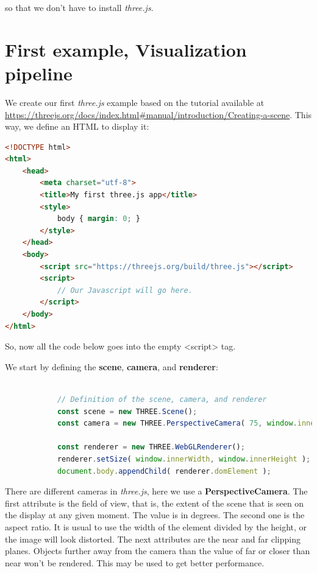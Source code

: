 \documentclass{article}
\begin{document}
so that we don't have to install \textit{three.js}.

\section{First example, Visualization pipeline}
We create our first \textit{three.js} example based on the tutorial available at \url{https://threejs.org/docs/index.html#manual/introduction/Creating-a-scene}. This way, we define an HTML to display it: 

\begin{lstlisting}[language=html, caption=Creating an HTML for display.]
<!DOCTYPE html>
<html>
	<head>
		<meta charset="utf-8">
		<title>My first three.js app</title>
		<style>
			body { margin: 0; }
		</style>
	</head>
	<body>
		<script src="https://threejs.org/build/three.js"></script>
		<script>
			// Our Javascript will go here.
		</script>
	</body>
</html>
\end{lstlisting}

So, now all the code below goes into the empty <script> tag.

We start by defining the \textbf{scene}, \textbf{camera}, and \textbf{renderer}:

\begin{lstlisting}[language=JavaScript, caption=Creating the scene.]

			// Definition of the scene, camera, and renderer
			const scene = new THREE.Scene();
			const camera = new THREE.PerspectiveCamera( 75, window.innerWidth / window.innerHeight, 0.1, 1000 );

			const renderer = new THREE.WebGLRenderer();
			renderer.setSize( window.innerWidth, window.innerHeight );
			document.body.appendChild( renderer.domElement );

\end{lstlisting}

There are different cameras in \textit{three.js}, here we use a \textbf{PerspectiveCamera}.
The first attribute is the field of view, that is, the extent of the scene that is seen on the
display at any given moment. The value is in degrees.
The second one is the aspect ratio. It is usual to use the width of the element divided
by the height, or the image will look distorted.
The next attributes are the near and far clipping planes. Objects further away from the
camera than the value of far or closer than near won't be rendered. This may be used to
get better performance. \\
\end{document}
